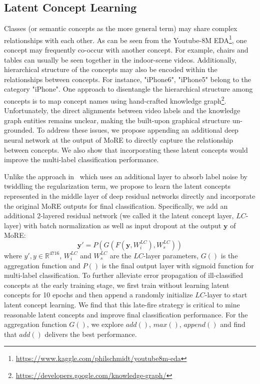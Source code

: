 \documentclass[10pt,twocolumn,letterpaper]{article}
\begin{document}
\subsection{Latent Concept Learning} 
Classes (or semantic concepts as the more general term) may share complex relationships with each other. As can be seen from the Youtube-8M EDA\footnote{\url{https://www.kaggle.com/philschmidt/youtube8m-eda}}, one concept may frequently co-occur with another concept. For example, chairs and tables can usually be seen together in the indoor-scene videos. Additionally, hierarchical structure of the concepts may also be encoded within the relationships between concepts. For instance, "iPhone6", "iPhone5" belong to the category "iPhone". One approach to disentangle the hierarchical structure among concepts is to map concept names using hand-crafted knowledge graph\footnote{\url{https://developers.google.com/knowledge-graph/}}. Unfortunately, the direct alignments between video labels and the knowledge graph entities remains unclear, making the built-upon graphical structure un-grounded. To address these issues, we propose appending an additional deep neural network at the output of MoRE to directly capture the relationship between concepts. We also show that incorporating these latent concepts would improve the multi-label classification performance.

Unlike the approach in~\cite{sukhbaatar2014training} which uses an additional layer to absorb label noise by twiddling the regularization term, we propose to learn the latent concepts represented in the middle layer of deep residual networks directly and incorporate the original MoRE outputs for final classification. Specifically, we add an additional 2-layered residual network (we called it the latent concept layer, $LC$-layer) with batch normalization as well as input dropout at the output $\mathbf{y}$ of MoRE:
\begin{equation}
\mathbf{y}'= P(G(F(\mathbf{y}, W_{i}^{LC}), W_{s}^{LC})) 
\end{equation}
where $y',y \in \mathbb{R}^{4716}$, $W_{i}^{LC}$ and $W_{s}^{LC}$ are the $LC$-layer parameters, $G()$ is the aggregation function and $P()$ is the final output layer with sigmoid function for multi-label classification. To further alleviate error propagation of ill-classified concepts at the early training stage, we first train without learning latent concepts for 10 epochs and then append a randomly initialize $LC$-layer to start latent concept learning. We find that this late-fire strategy is critical to mine reasonable latent concepts and improve final classification performance. For the aggregation function $G()$, we explore $add()$, $max()$, $append()$ and find that $add()$ delivers the best performance.
\end{document}
